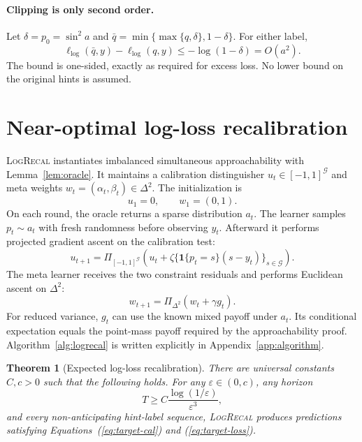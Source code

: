 \documentclass{article}
\newtheorem{theorem}{Theorem}
\newcommand{\method}{\textsc{LogRecal}\xspace}
\newcommand{\simplex}{\Delta}
\begin{document}
\paragraph{Clipping is only second order.}
Let $\delta=p_0=\sin^2a$ and $\bar q=\min\{\max\{q,\delta\},1-\delta\}$. For either label,
\begin{equation}
 \ell_{\log}(\bar q,y)-\ell_{\log}(q,y)
 \leq-\log(1-\delta)=O(a^2).
 \label{eq:clip}
\end{equation}
The bound is one-sided, exactly as required for excess loss. No lower bound on the original hints is assumed.

\section{Near-optimal log-loss recalibration}
\label{sec:algorithm}

\method instantiates imbalanced simultaneous approachability with Lemma~\ref{lem:oracle}. It maintains a calibration distinguisher $u_t\in[-1,1]^{\mathcal G}$ and meta weights $w_t=(\alpha_t,\beta_t)\in\simplex^2$. The initialization is
\begin{equation}
 u_1=0,\qquad w_1=(0,1).
 \label{eq:init}
\end{equation}
On each round, the oracle returns a sparse distribution $a_t$. The learner samples $p_t\sim a_t$ with fresh randomness before observing $y_t$. Afterward it performs projected gradient ascent on the calibration test:
\begin{equation}
 u_{t+1}=\Pi_{[-1,1]^{\mathcal G}}
 \left(u_t+\zeta\{\mathbf{1}\{p_t=s\}(s-y_t)\}_{s\in\mathcal G}\right).
 \label{eq:u-update}
\end{equation}
The meta learner receives the two constraint residuals and performs Euclidean ascent on $\simplex^2$:
\begin{equation}
 w_{t+1}=\Pi_{\simplex^2}(w_t+\gamma g_t).
 \label{eq:meta-update}
\end{equation}
For reduced variance, $g_t$ can use the known mixed payoff under $a_t$. Its conditional expectation equals the point-mass payoff required by the approachability proof. Algorithm~\ref{alg:logrecal} is written explicitly in Appendix~\ref{app:algorithm}.

\begin{theorem}[Expected log-loss recalibration]
\label{thm:upper}
There are universal constants $C,c>0$ such that the following holds. For any $\varepsilon\in(0,c)$, any horizon
\begin{equation}
 T\geq C\frac{\log(1/\varepsilon)}{\varepsilon^3},
 \label{eq:horizon}
\end{equation}
and every non-anticipating hint-label sequence, \method produces predictions satisfying Equations~(\ref{eq:target-cal}) and (\ref{eq:target-loss}).
\end{theorem}
\end{document}

